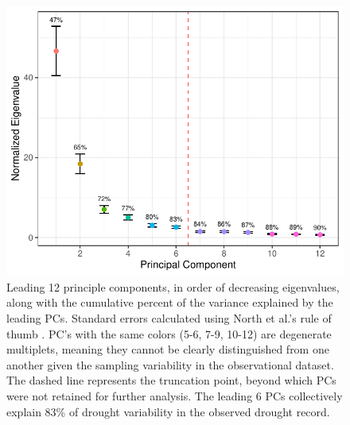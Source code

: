 \documentclass[11pt]{wlscirep}
\begin{document}
\begin{figure}[!ht]
\centering
\includegraphics[width=.7\linewidth]{figures/scree.pdf}
\caption{Leading 12 principle components, in order of decreasing eigenvalues, along with the cumulative percent of the variance explained by the leading PCs. Standard errors calculated using North et al.'s rule of thumb \cite{North1982}. PC's with the same colors (5-6, 7-9, 10-12) are degenerate multiplets, meaning they cannot be clearly distinguished from one another given the sampling variability in the observational dataset. The dashed line represents the truncation point, beyond which PCs were not retained for further analysis. The leading 6 PCs collectively explain 83\% of drought variability in the observed drought record.}
\label{fig:scree}
\end{figure}
\end{document}
